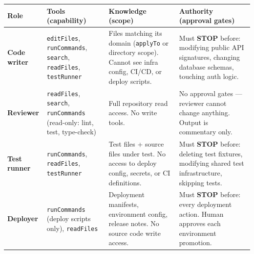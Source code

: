 \documentclass[
  a4paper,
  DIV=11,
  numbers=noendperiod]{scrreprt}
\newcounter{none} %
\begin{document}
{\def\LTcaptype{none} %
\begin{longtable}[]{@{}
  >{\raggedright\arraybackslash}p{}
  >{\raggedright\arraybackslash}p{}
  >{\raggedright\arraybackslash}p{}
  >{\raggedright\arraybackslash}p{}@{}}
\toprule\noalign{}
\begin{minipage}[b]{\linewidth}\raggedright
Role
\end{minipage} & \begin{minipage}[b]{\linewidth}\raggedright
Tools (capability)
\end{minipage} & \begin{minipage}[b]{\linewidth}\raggedright
Knowledge (scope)
\end{minipage} & \begin{minipage}[b]{\linewidth}\raggedright
Authority (approval gates)
\end{minipage} \\
\midrule\noalign{}
\endhead
\bottomrule\noalign{}
\endlastfoot
\textbf{Code writer} & \texttt{editFiles}, \texttt{runCommands},
\texttt{search}, \texttt{readFiles}, \texttt{testRunner} & Files
matching its domain (\texttt{applyTo} or directory scope). Cannot see
infra config, CI/CD, or deploy scripts. & Must \textbf{STOP} before:
modifying public API signatures, changing database schemas, touching
auth logic. \\
\textbf{Reviewer} & \texttt{readFiles}, \texttt{search},
\texttt{runCommands} (read-only: lint, test, type-check) & Full
repository read access. No write tools. & No approval gates --- reviewer
cannot change anything. Output is commentary only. \\
\textbf{Test runner} & \texttt{runCommands}, \texttt{readFiles},
\texttt{testRunner} & Test files + source files under test. No access to
deploy config, secrets, or CI definitions. & Must \textbf{STOP} before:
deleting test fixtures, modifying shared test infrastructure, skipping
tests. \\
\textbf{Deployer} & \texttt{runCommands} (deploy scripts only),
\texttt{readFiles} & Deployment manifests, environment config, release
notes. No source code write access. & Must \textbf{STOP} before: every
deployment action. Human approves each environment promotion. \\
\end{longtable}
}
\end{document}

